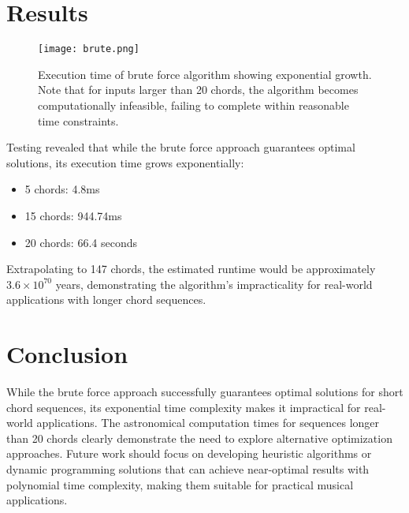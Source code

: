 \documentclass[lettersize,journal]{IEEEtran}
\begin{document}
\section{Results}

\begin{figure}[h!]
    \centering
    \texttt{[image: brute.png]}
    \caption{Execution time of brute force algorithm showing exponential growth. Note that for inputs larger than 20 chords, the algorithm becomes computationally infeasible, failing to complete within reasonable time constraints.}
\end{figure}


Testing revealed that while the brute force approach guarantees optimal solutions, its execution time grows exponentially:
\begin{itemize}
    \item 5 chords: 4.8ms
    \item 15 chords: 944.74ms
    \item 20 chords: 66.4 seconds
\end{itemize}

Extrapolating to 147 chords, the estimated runtime would be approximately $3.6 \times 10^{70}$ years, demonstrating the algorithm's impracticality for real-world applications with longer chord sequences.

\section{Conclusion}
While the brute force approach successfully guarantees optimal solutions for short chord sequences, its exponential time complexity makes it impractical for real-world applications. The astronomical computation times for sequences longer than 20 chords clearly demonstrate the need to explore alternative optimization approaches. Future work should focus on developing heuristic algorithms or dynamic programming solutions that can achieve near-optimal results with polynomial time complexity, making them suitable for practical musical applications.
\end{document}

